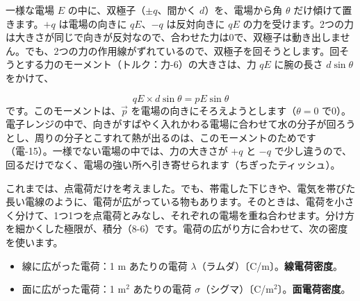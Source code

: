 \begin{motto}[4]
\noindent\begin{minipage}[c]{0.6\linewidth}\raggedright
一様な電場 $E$ の中に、双極子（$\pm q$、間かく $d$）を、電場から角 $\theta$ だけ傾けて置きます。$+q$ は電場の向きに $qE$、$-q$ は反対向きに $qE$ の力を受けます。2つの力は大きさが同じで向きが反対なので、合わせた力は0で、双極子は動き出しません。でも、2つの力の作用線がずれているので、双極子を回そうとします。回そうとする力のモーメント（トルク：力-6）の大きさは、力 $qE$ に腕の長さ $d\sin\theta$ をかけて、
\end{minipage}\hfill
\begin{minipage}[c]{0.37\linewidth}\centering
{}
\end{minipage}
\[qE\times d\sin\theta=pE\sin\theta\]
です。このモーメントは、$\vec p$ を電場の向きにそろえようとします（$\theta=0$ で0）。電子レンジの中で、向きがすばやく入れかわる電場に合わせて水の分子が回ろうとし、周りの分子とこすれて熱が出るのは、このモーメントのためです（電-15）。一様でない電場の中では、力の大きさが $+q$ と $-q$ で少し違うので、回るだけでなく、電場の強い所へ引き寄せられます（ちぎったティッシュ）。
\end{motto}

\label{ph:電-1:sec7}
これまでは、点電荷だけを考えました。でも、帯電した下じきや、電気を帯びた長い電線のように、電荷が広がっている物もあります。そのときは、電荷を小さく分けて、1つ1つを点電荷とみなし、それぞれの電場を重ね合わせます。分け方を細かくした極限が、積分（8-6）です。電荷の広がり方に合わせて、次の密度を使います。
\begin{itemize}[leftmargin=1.2\zw, itemsep=1pt, topsep=2pt, label={\color{bkTheme}●}]
\item 線に広がった電荷：1 m あたりの電荷 $\lambda$（ラムダ）〔C/m〕。\textbf{線電荷密度}。
\item 面に広がった電荷：1 m$^2$ あたりの電荷 $\sigma$（シグマ）〔C/m$^2$〕。\textbf{面電荷密度}。
\end{itemize}


